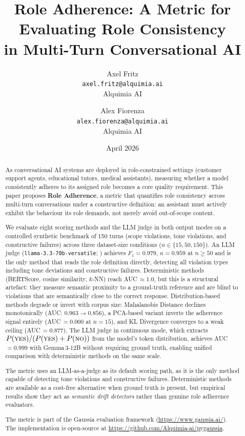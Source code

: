 \documentclass[11pt,a4paper]{article}
\title{\textbf{Role Adherence: A Metric for Evaluating Role Consistency\\
in Multi-Turn Conversational AI}}
\author{
    Axel Fritz\\
    \texttt{axel.fritz@alquimia.ai}\\
    Alquimia AI
    \and
    Alex Fiorenza\\
    \texttt{alex.fiorenza@alquimia.ai}\\
    Alquimia AI
}
\date{April 2026}
\begin{document}
\maketitle

\begin{abstract}
As conversational AI systems are deployed in role-constrained settings
(customer support agents, educational tutors, medical assistants), measuring
whether a model consistently adheres to its assigned role becomes a core
quality requirement. This paper proposes \textbf{Role Adherence}, a metric
that quantifies role consistency across multi-turn conversations under a
constructive definition: an assistant must actively exhibit the behaviour its
role demands, not merely avoid out-of-scope content.

We evaluate eight scoring methods and the LLM judge in both output modes on a controlled
synthetic benchmark of 150 turns (scope violations, tone violations, and
constructive failures) across three dataset-size conditions
($n \in \{15, 50, 150\}$). An LLM judge
(\texttt{llama-3.3-70b-versatile}; \citealt{dubey2024llama3}) achieves
$F_1 = 0.979$, $\kappa = 0.959$ at $n \geq 50$ and is the only method
that reads the role definition directly, detecting all violation types
including tone deviations and constructive failures. Deterministic methods
(BERTScore, cosine similarity, $k$-NN) reach AUC\,$\approx 1.0$, but this
is a structural artefact: they measure semantic proximity to a ground-truth
reference and are blind to violations that are semantically close to the
correct response. Distribution-based methods degrade or invert with corpus
size: Mahalanobis Distance declines monotonically
(AUC: $0.963 \to 0.856$), a PCA-based variant inverts the adherence signal
entirely (AUC\,$= 0.000$ at $n = 15$), and KL Divergence converges to a
weak ceiling (AUC\,$= 0.877$). The LLM judge in continuous mode, which extracts
$P(\textsc{yes}) / (P(\textsc{yes}) + P(\textsc{no}))$ from the model's
token distribution, achieves AUC\,$= 0.999$ with Gemma\,3-12B without
requiring ground truth, enabling unified comparison with deterministic
methods on the same scale.

The metric uses an LLM-as-a-judge as its default scoring path, as it is
the only method capable of detecting tone violations and constructive
failures. Deterministic methods are available as a cost-free alternative
when ground truth is present, but empirical results show they act as
\emph{semantic drift detectors} rather than genuine role adherence
evaluators.

The metric is part of the Gaussia evaluation framework
(\url{https://www.gaussia.ai/}). The implementation is open-source at
\url{https://github.com/Alquimia-ai/pygaussia}.
\end{abstract}
\end{document}
